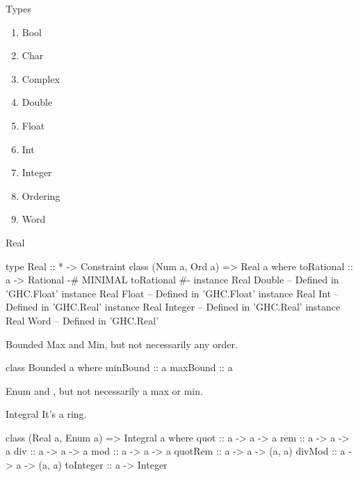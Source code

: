 \documentclass[openany, 11pt]{book}
\begin{document}
\begin{definition}{Types}{}
	\begin{multicols}{2}
		\begin{enumerate}[label = {(\arabic*)}]
			\item Bool
			\item Char
			\item Complex
			\item Double
			\item Float
			\item Int
			\item Integer
			\item Ordering
			\item Word
		\end{enumerate}
	\end{multicols}
\end{definition}



\begin{intuition}{Real}{}
	\begin{haskell}{}
type Real :: * -> Constraint
class (Num a, Ord a) => Real a where
toRational :: a -> Rational
    {-# MINIMAL toRational #-}
instance Real Double -- Defined in 'GHC.Float’
instance Real Float -- Defined in 'GHC.Float’
instance Real Int -- Defined in 'GHC.Real’
instance Real Integer -- Defined in 'GHC.Real’
instance Real Word -- Defined in 'GHC.Real’
	\end{haskell}
\end{intuition}

\begin{intuition}{Bounded}{}
	Max and Min, but not necessarily any order.
	\begin{haskell}{}
class Bounded a where
    minBound :: a
    maxBound :: a
	\end{haskell}
\end{intuition}

\begin{intuition}{Enum}{}
	 and , but not necessarily a max or min.
\end{intuition}

\begin{intuition}{Integral}{}
	It's a ring.
	\begin{haskell}{}
class (Real a, Enum a) => Integral a where
    quot :: a -> a -> a
    rem :: a -> a -> a
    div :: a -> a -> a
    mod :: a -> a -> a
    quotRem :: a -> a -> (a, a)
    divMod :: a -> a -> (a, a)
    toInteger :: a -> Integer
    \end{haskell}
\end{intuition}
\end{document}
